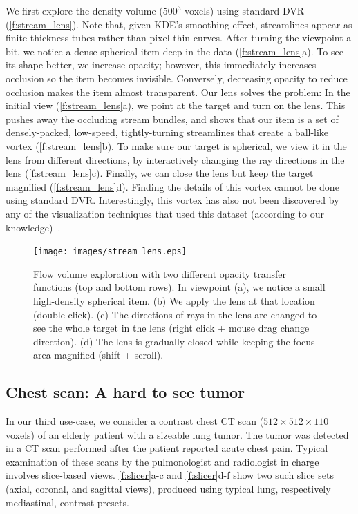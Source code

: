 We first explore the density volume ($500^3$ voxels) using standard DVR (\autoref{f:stream_lens}). Note that, given KDE's smoothing effect, streamlines appear as finite-thickness tubes rather than pixel-thin curves. After turning the viewpoint a bit, we notice a dense spherical item deep in the data (\autoref{f:stream_lens}a). To see its shape better, we increase opacity; however, this immediately increases occlusion so the item becomes invisible. Conversely, decreasing opacity to reduce occlusion makes the item almost transparent. Our lens solves the problem: In the initial view (\autoref{f:stream_lens}a), we point at the target and turn on the lens. This pushes away the occluding stream bundles, and shows that our item is a set of densely-packed, low-speed, tightly-turning streamlines that create a ball-like vortex (\autoref{f:stream_lens}b). 
To make sure our target is spherical, we view it in the lens from different directions, by interactively changing the ray directions in the lens (\autoref{f:stream_lens}c). Finally, we can close the lens but keep the target magnified (\autoref{f:stream_lens}d).
Finding the details of this vortex cannot be done using standard DVR. Interestingly, this vortex has also not been discovered by any of the visualization techniques that used this dataset (according to our knowledge) \,\cite{telea_vis_99,griebel2004flow,ddh,lhuillier2017ffteb}. 

\begin{figure}
\centering
\texttt{[image: images/stream\_lens.eps]}

\caption{Flow volume exploration with two different opacity transfer functions (top and bottom rows). In viewpoint (a), we notice a small high-density spherical item. (b) We apply the lens at that location (double click). (c) The directions of rays in the lens are changed to see the whole target in the lens (right click + mouse drag change direction). (d) The lens is gradually closed while keeping the focus area magnified (shift + scroll).}

\label{f:stream_lens}
\end{figure}

\subsection{Chest scan: A hard to see tumor}
\label{sec:chest}
%
In our third use-case, we consider a contrast chest CT scan ($512 \times 512 \times 110$ voxels) of an elderly patient with a sizeable lung tumor. The tumor was detected in a CT scan performed after the patient reported acute chest pain. Typical examination of these scans by the pulmonologist and radiologist in charge involves slice-based views. \autoref{f:slicer}a-c and \autoref{f:slicer}d-f show two such slice sets (axial, coronal, and sagittal views), produced using typical lung, respectively mediastinal, contrast presets.

